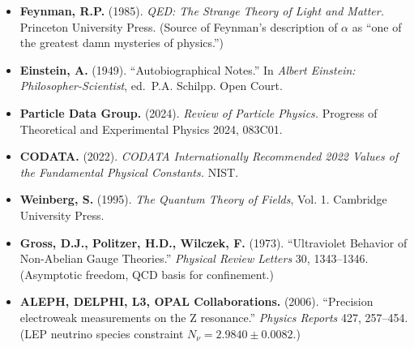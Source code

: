 \documentclass[12pt]{article}
\begin{document}
\begin{itemize}
\item
  \textbf{Feynman, R.P.} (1985). \emph{QED: The Strange Theory of Light
  and Matter.} Princeton University Press. (Source of Feynman's
  description of \(\alpha\) as ``one of the greatest damn mysteries of
  physics.'')
\item
  \textbf{Einstein, A.} (1949). ``Autobiographical Notes.'' In
  \emph{Albert Einstein: Philosopher-Scientist}, ed.~P.A. Schilpp. Open
  Court.
\item
  \textbf{Particle Data Group.} (2024). \emph{Review of Particle
  Physics.} Progress of Theoretical and Experimental Physics 2024,
  083C01.
\item
  \textbf{CODATA.} (2022). \emph{CODATA Internationally Recommended 2022
  Values of the Fundamental Physical Constants.} NIST.
\item
  \textbf{Weinberg, S.} (1995). \emph{The Quantum Theory of Fields},
  Vol. 1. Cambridge University Press.
\item
  \textbf{Gross, D.J., Politzer, H.D., Wilczek, F.} (1973).
  ``Ultraviolet Behavior of Non-Abelian Gauge Theories.'' \emph{Physical
  Review Letters} 30, 1343--1346. (Asymptotic freedom, QCD basis for
  confinement.)
\item
  \textbf{ALEPH, DELPHI, L3, OPAL Collaborations.} (2006). ``Precision
  electroweak measurements on the Z resonance.'' \emph{Physics Reports}
  427, 257--454. (LEP neutrino species constraint
  \(N_\nu = 2.9840 \pm 0.0082\).)
\end{itemize}
\end{document}
